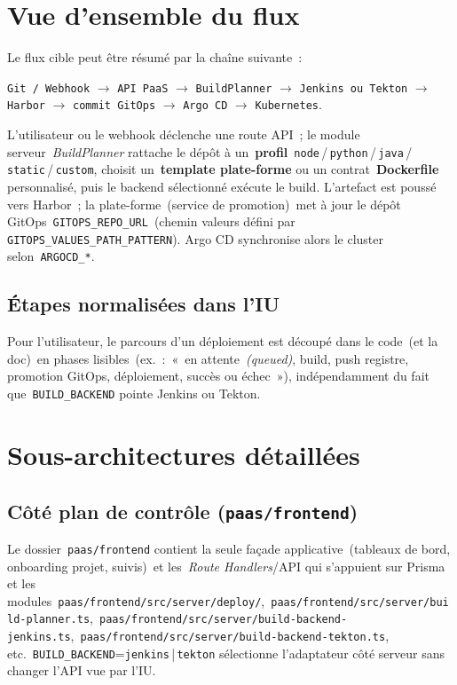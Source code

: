 \section{Vue d'ensemble du flux}

Le flux cible peut être résumé par la chaîne suivante~:

\begin{center}
\texttt{Git / Webhook} $\rightarrow$ \texttt{API PaaS} $\rightarrow$ \texttt{BuildPlanner} $\rightarrow$ \texttt{Jenkins ou Tekton} $\rightarrow$ \texttt{Harbor} $\rightarrow$ \texttt{commit GitOps} $\rightarrow$ \texttt{Argo CD} $\rightarrow$ \texttt{Kubernetes}.
\end{center}

L'utilisateur ou le webhook déclenche une route API~; le module serveur~\emph{BuildPlanner} rattache le dépôt à un~\textbf{profil}~\texttt{node}\,/\,\texttt{python}\,/\,\texttt{java}\,/\,\texttt{static}\,/\,\texttt{custom}, choisit un~\textbf{template plate-forme} ou un contrat~\textbf{Dockerfile} personnalisé, puis le backend sélectionné exécute le build. L'artefact est poussé vers Harbor~; la plate-forme~(service de promotion)~met à jour le dépôt GitOps~\texttt{GITOPS\_REPO\_URL}~(chemin valeurs défini par \texttt{GITOPS\_VALUES\_PATH\_PATTERN}). Argo CD synchronise alors le cluster selon~\texttt{ARGOCD\_*}.

\subsection*{Étapes normalisées dans l'IU}

Pour l'utilisateur, le parcours d'un déploiement est découpé dans le code~(et la doc)~en phases lisibles~(ex.~:~«~en attente~\emph{(queued)}, build, push registre, promotion GitOps, déploiement, succès ou échec~»), indépendamment du fait que~\texttt{BUILD\_BACKEND} pointe Jenkins ou Tekton.

\section{Sous-architectures détaillées}

\subsection{Côté plan de contrôle (\texttt{paas/frontend})}

Le dossier~\texttt{paas/frontend} contient la seule façade applicative~(tableaux de bord, onboarding projet, suivis)~et les~\emph{Route Handlers}/API qui s'appuient sur Prisma et les modules~\texttt{paas/frontend/src/server/deploy/},~\texttt{paas/frontend/src/server/build-planner.ts},~\texttt{paas/frontend/src/server/build-backend-jenkins.ts},~\texttt{paas/frontend/src/server/build-backend-tekton.ts}, etc.~\texttt{BUILD\_BACKEND}=\texttt{jenkins}\,|\,\texttt{tekton} sélectionne l'adaptateur côté serveur sans changer l'API vue par l'IU.

